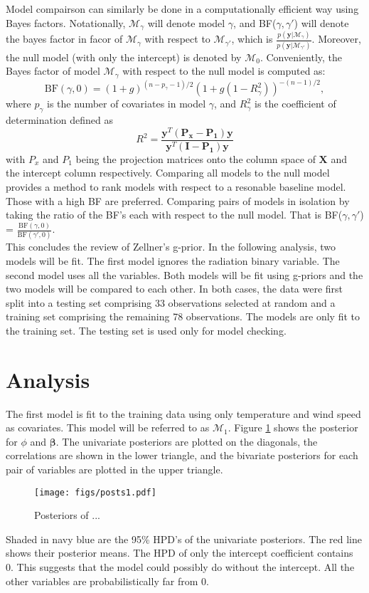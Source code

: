 \documentclass{../../tex_template/asaproc}
\newcommand{\y}{\bm y}
\newcommand{\X}{\bm X}
\newcommand{\M}{\mathcal{M}}
\begin{document}
Model compairson can similarly be done in a computationally efficient way using
Bayes factors. Notationally, $\M_\gamma$ will denote model $\gamma$, and
BF($\gamma,\gamma'$) will denote the bayes factor in facor of $\M_\gamma$ with
respect to $\M_{\gamma'}$, which is
$\frac{p(\y|\M_\gamma)}{p(\y|\M_{\gamma'})}$. Moreover,
the null model (with only the intercept) is denoted by $\M_{0}$. Conveniently,
the Bayes factor of model $\M_\gamma$ with respect to the null model is
computed as: \\
\[
  \text{BF}(\gamma,0) = (1+g)^{(n-p_\gamma-1)/2} (1+g(1-R^2_\gamma))^{-(n-1)/2},
\]
where $p_\gamma$ is the number of covariates in model $\gamma$, and $R^2_\gamma$
is the coefficient of determination defined as 
\[
  R^2 = \frac{\y^T(\bm {P_x-P_1})\y}{\y^T(\bm {I-P_1})\y}
\]
with $P_x$ and $P_1$ being the projection matrices onto the column space
of $\X$ and the intercept column respectively. Comparing all models
to the null model provides a method to rank models with respect to a 
resonable baseline model. Those with a high BF are preferred. Comparing 
pairs of models in isolation by taking the ratio of the BF's each
with respect to the null model. That is BF($\gamma,\gamma'$) = 
$\frac{\text{BF}(\gamma,0)}{\text{BF}(\gamma',0)}$.\\

This concludes the review of Zellner's g-prior. In the following 
analysis, two models will be fit. The first model ignores the radiation
binary variable. The second model uses all the variables. Both models
will be fit using g-priors and the two models will be compared to
each other. In both cases, the data were first split into a testing
set comprising 33 observations selected at random and a training 
set comprising the remaining 78 observations. The models are
only fit to the training set. The testing set is used only for
model checking.

\section{Analysis}
The first model is fit to the training data using only temperature and wind
speed as covariates. This model will be referred to as $\M_1$. Figure 
\ref{fig:posts1} shows the posterior for $\phi$ and $\bm\beta$.
The univariate posteriors are plotted on the diagonals, the correlations
are shown in the lower triangle, and the bivariate posteriors for each 
pair of variables are plotted in the upper triangle.
\begin{figure}[H]
  \texttt{[image: figs/posts1.pdf]}
  \caption{\small Posteriors of ... }
  \label{fig:posts1}
\end{figure}
Shaded in navy blue are the 95\% HPD's of the univariate posteriors.
The red line shows their posterior means. The HPD of only the intercept
coefficient contains 0. This suggests that the model could possibly
do without the intercept. All the other variables are probabilistically
far from 0. \\
\end{document}
